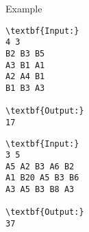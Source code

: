 Example
\begin{verbatim}
\textbf{Input:}
4 3
B2 B3 B5
A3 B1 A1
A2 A4 B1
B1 B3 A3

\textbf{Output:}
17
\end{verbatim}
\begin{verbatim}
\textbf{Input:}
3 5
A5 A2 B3 A6 B2
A1 B20 A5 B3 B6
A3 A5 B3 B8 A3

\textbf{Output:}
37\end{verbatim}